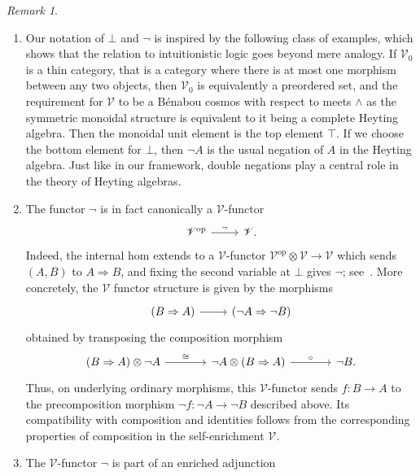 \documentclass[11pt,onecolumn]{article}
\newcommand{\cV}{\mathscr{V}}
\newcommand{\op}{\mathrm{op}}
\theoremstyle{plain}
\theoremstyle{remark}
\newtheorem{remark}[remark]{Remark}
\theoremstyle{definition}
\begin{document}
\begin{remark}
	\label{rem:negation}
	\begin{enumerate}
		\item\label{rem:negation_heyting}
			Our notation of $\bot$ and $\neg$ is inspired by the following class of examples,
			which shows that the relation to intuitionistic logic goes beyond mere analogy.
			If $\cV_0$ is a thin category, that is a category where there is at most one morphism between any two objects,
			then $\cV_0$ is equivalently a preordered set, and the requirement for $\cV$ to be a B\'enabou cosmos with respect to meets $\land$ as the symmetric monoidal structure
			is equivalent to it being a complete Heyting algebra.
			Then the monoidal unit element is the top element $\top$.
			If we choose the bottom element for $\bot$, then $\neg A$ is the usual negation of $A$ in the Heyting algebra.
			Just like in our framework, double negations play a central role in the theory of Heyting algebras.
		\item\label{rem:negation_functor}
			The functor $\neg$ is in fact canonically a $\cV$-functor
				\[
					\begin{tikzcd}
						\cV^\op \ar[r, "\neg"] & \cV.
					\end{tikzcd}
				\]
				Indeed, the internal hom extends to a $\cV$-functor $\cV^\op \otimes \cV \to \cV$ which sends $(A,B)$ to $A\Rightarrow B$, and fixing the second variable at $\bot$ gives $\neg$; see~\cite[\S 1.6]{Kelly}.
				More concretely, the $\cV$ functor structure is given by the morphisms
				\[
					\begin{tikzcd}
						\left( B\Rightarrow A \right) \ar[r] & \left( \neg A\Rightarrow\neg B \right)
					\end{tikzcd}
				\]
				obtained by transposing the composition morphism
				\[
					\begin{tikzcd}[column sep=large]
						(B\Rightarrow A)\otimes\neg A
						\ar[r, "\cong"]
						&
						\neg A\otimes(B\Rightarrow A)
						\ar[r, "\circ"]
						&
						\neg B.
					\end{tikzcd}
				\]
				Thus, on underlying ordinary morphisms, this $\cV$-functor sends $f\colon B\to A$ to the precomposition morphism $\neg f\colon\neg A\to\neg B$ described above.
				Its compatibility with composition and identities follows from the corresponding properties of composition in the self-enrichment $\cV$.
			\item The $\cV$-functor $\neg$ is part of an enriched adjunction
				\begin{equation}

\end{equation}
\end{enumerate}
\end{remark}
\end{document}
